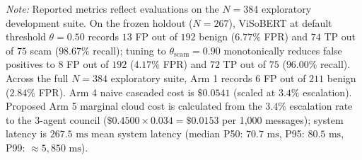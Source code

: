 \begin{table}[t]
\centering
\caption{Comparative End-to-End System Benchmark Across Architectural Arms ($N=384$ Combined Development Samples, $\tau=0.90$)}
\label{tab:e2e_benchmark}
\renewcommand{\arraystretch}{0.92}
\par\vspace{6pt}
\parbox{\textwidth}{\footnotesize \textit{Note:} Reported metrics reflect evaluations on the $N=384$ exploratory development suite. On the frozen holdout ($N=267$), ViSoBERT at default threshold $\theta = 0.50$ records $13$ FP out of $192$ benign ($6.77\%$ FPR) and $74$ TP out of $75$ scam ($98.67\%$ recall); tuning to $\theta_{\text{scam}} = 0.90$ monotonically reduces false positives to $8$ FP out of $192$ ($4.17\%$ FPR) and $72$ TP out of $75$ ($96.00\%$ recall). Across the full $N=384$ exploratory suite, Arm 1 records $6$ FP out of $211$ benign ($2.84\%$ FPR). Arm 4 naive cascaded cost is $\$0.0541$ (scaled at $3.4\%$ escalation). Proposed Arm 5 marginal cloud cost is calculated from the $3.4\%$ escalation rate to the 3-agent council ($\$0.4500 \times 0.034 = \$0.0153$ per 1,000 messages); system latency is $267.5\text{ ms}$ mean system latency (median P50: $70.7\text{ ms}$, P95: $80.5\text{ ms}$, P99: $\approx 5,850\text{ ms}$).}
\end{table}

